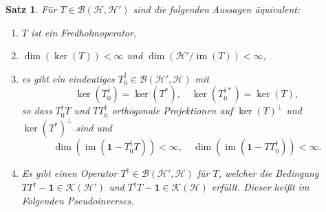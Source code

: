 \documentclass[11pt, hidelinks]{article}
\newcommand{\h}{\mathcal{H}}
\newcommand{\im}{\operatorname{im}}
\numberwithin{conj}{section}
\newtheorem{theorem}[conj]{Satz}
\begin{document}
\begin{theorem}
    \label{fredholm}
    Für $T \in \mathcal{B}(\h,\h')$ sind die folgenden Aussagen äquivalent:
    \begin{enumerate}
        \item $T$ ist ein Fredholmoperator,
        \item $ \dim(\ker(T)) < \infty$ und $\dim(\h' / \im(T)) < \infty$,
        \item es gibt ein eindeutiges $T^\dagger_0 \in \mathcal{B}(\h',\h)$ mit
        \begin{equation}
            \ker(T^\dagger_0) = \ker(T^\ast), \quad \ker(T^{\dagger\ast}_0) = \ker(T),
        \end{equation}
        so dass $T^\dagger_0T$ und $TT^\dagger_0$ orthogonale Projektionen auf $\ker(T)^\perp$ und $\ker(T^\ast)^\perp$ sind und
        \begin{equation}
            \dim(\im(\mathbf{1}-T^\dagger_0T)) < \infty, \quad \dim(\im(\mathbf{1}-TT^\dagger_0)) < \infty.
        \end{equation}
        \item Es gibt einen Operator $T^\dagger\in \mathcal{B}(\h',\h)$ für $T$, welcher die Bedingung $TT^\dagger-\mathbf{1} \in \mathcal{K}(\h')$ und $T^\dagger T-\mathbf{1} \in \mathcal{K}(\h)$ erfüllt. Dieser heißt im Folgenden Pseudoinverses.
    \end{enumerate}
\end{theorem}
\end{document}
